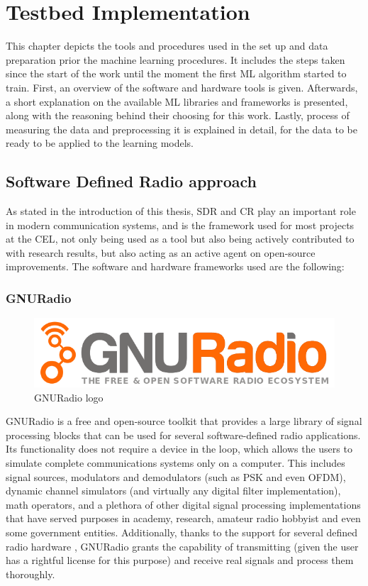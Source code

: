 \acresetall
\chapter{Testbed Implementation}\label{chapter:implementation}\label{ch:implementation}
This chapter depicts the tools and procedures used in the set up and data preparation prior the machine learning procedures. It includes the steps taken since the start of the work until the moment the first \ac{ML} algorithm started to train. First, an overview of the software and hardware tools is given. Afterwards, a short explanation on the available \ac{ML} libraries and frameworks is presented, along with the reasoning behind their choosing for this work. Lastly, process of measuring the data and preprocessing it is explained in detail, for the data to be ready to be applied to the learning models.
\section{Software Defined Radio approach}
As stated in the introduction of this thesis, \ac{SDR} and \ac{CR} play an important role in modern communication systems, and is the framework used for most projects at the \ac{CEL}, not only being used as a tool but also being actively contributed to with research results, but also acting as an active agent on open-source improvements. The software and hardware frameworks used are the following:
\subsection{GNURadio}
\begin{figure}[htb]
    \centering
      \includegraphics[width=\textwidth]{figures/gnuradio_logo}
      \caption{GNURadio logo}
      \label{fig:gnuradio}
\end{figure}
GNURadio \cite{GNURadio2016} is a free and open-source toolkit that provides a large library of signal processing blocks that can be used for several software-defined radio applications. Its functionality does not require a device in the loop, which allows the users to simulate complete communications systems only on a computer. This includes signal sources, modulators and demodulators (such as \ac{PSK} and even \ac{OFDM}), dynamic channel simulators (and virtually any digital filter implementation), math operators, and a plethora of other digital signal processing implementations that have served purposes in academy, research, amateur radio hobbyist and even some government entities. Additionally, thanks to the support for several defined radio hardware \cite{gnuradiohw}, GNURadio grants the capability of transmitting (given the user has a rightful license for this purpose) and receive real signals and process them thoroughly.\\

